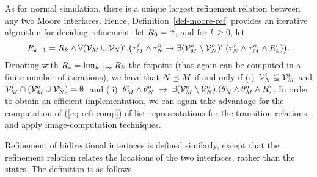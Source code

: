 

\noindent
As for normal simulation, there is a unique largest
refinement relation between any two Moore interfaces. 
Hence, Definition~\ref{def-moore-ref}
provides an iterative algorithm for deciding refinement: 
let $R_0 = \mbox{\sc t}$, and for $k \geq 0$, let 
%
\begin{equation} \label{eq-refi-comp} 
  \rrp_{k+1} = \rrp_k \und \forall (\vars_\mp \union \vars_\mq)' . 
  \bigl(\itrans_\mp \und \otrans_\mq \im 
  \exists (\ovars_\mp \setm \ovars_\mq)' . 
  (\itrans_\mq \und \otrans_\mp \und \rrp_k')\bigr).
\end{equation}
% 
Denoting with $R_* = \lim_{k \rightarrow \infty} R_k$ the fixpoint
(that again can be computed in a finite number of iterations), 
we have that $N \preceq M$ if and only if (i)~${\cal V}^i_N \subseteq
{\cal V}^i_M$ and  ${\cal V}^i_M \cap ({\cal V}^o_M \cup {\cal V}^o_N) =
\emptyset$, and (ii)~$\theta^i_M \wedge \theta^o_N \;\rightarrow\; \exists 
({\cal V}^o_M \setminus {\cal V}^o_N) . (\theta^i_N \wedge \theta^o_M \wedge R)$. 
In order to obtain an efficient implementation, we can again take
advantage for the computation of (\ref{eq-refi-comp}) of list
representations for the transition relations, and apply
image-computation techniques. 

Refinement of bidirectional  interfaces is defined similarly,
except that the refinement relation relates the locations of the two
interfaces, rather than the states. 
The definition is as follows. 

